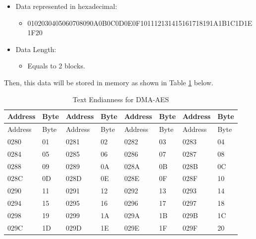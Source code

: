 \documentclass[main\_\_EN.tex]{subfiles}
\begin{document}
\begin{itemize}
    \item Data represented in hexadecimal:
    \begin{itemize}
    \item 0102030405060708090A0B0C0D0E0F101112131415161718191A1B1C1D1E1F20
    \end{itemize}
\item Data Length:
    \begin{itemize}
    \item Equals to 2 blocks.
    \end{itemize}
\end{itemize}

Then, this data will be stored in memory as shown in Table \ref{table:DMAAESPlaintextCiphertextEndian} below.

\begin{longtable}[c]
{ | l | l |l | l | l | l | l | l |}
\caption{Text Endianness for DMA-AES}
\label{table:DMAAESPlaintextCiphertextEndian}\\
\hline
\rowcolor{lightgray}
Address &  Byte  & Address &  Byte  & Address &  Byte  & Address &  Byte \\\hline
\endfirsthead
\hline
\rowcolor{lightgray}
Address &  Byte  & Address &  Byte  & Address &  Byte  & Address &  Byte \\\hline
\endhead
\endfoot
\hexprefix{}0280 & \hexprefix{}01 & \hexprefix{}0281 & \hexprefix{}02 & \hexprefix{}0282 & \hexprefix{}03 & \hexprefix{}0283 & \hexprefix{}04 \\\hline
\hexprefix{}0284 & \hexprefix{}05 & \hexprefix{}0285 & \hexprefix{}06 & \hexprefix{}0286 & \hexprefix{}07 & \hexprefix{}0287 & \hexprefix{}08 \\\hline
\hexprefix{}0288 & \hexprefix{}09 & \hexprefix{}0289 & \hexprefix{}0A & \hexprefix{}028A & \hexprefix{}0B & \hexprefix{}028B & \hexprefix{}0C \\\hline
\hexprefix{}028C & \hexprefix{}0D & \hexprefix{}028D & \hexprefix{}0E & \hexprefix{}028E & \hexprefix{}0F & \hexprefix{}028F & \hexprefix{}10 \\\hline
\hexprefix{}0290 & \hexprefix{}11 & \hexprefix{}0291 & \hexprefix{}12 & \hexprefix{}0292 & \hexprefix{}13 & \hexprefix{}0293 & \hexprefix{}14 \\\hline
\hexprefix{}0294 & \hexprefix{}15 & \hexprefix{}0295 & \hexprefix{}16 & \hexprefix{}0296 & \hexprefix{}17 & \hexprefix{}0297 & \hexprefix{}18 \\\hline
\hexprefix{}0298 & \hexprefix{}19 & \hexprefix{}0299 & \hexprefix{}1A & \hexprefix{}029A & \hexprefix{}1B & \hexprefix{}029B & \hexprefix{}1C \\\hline
\hexprefix{}029C & \hexprefix{}1D & \hexprefix{}029D & \hexprefix{}1E & \hexprefix{}029E & \hexprefix{}1F & \hexprefix{}029F & \hexprefix{}20 \\\hline
\end{longtable}
\end{document}

